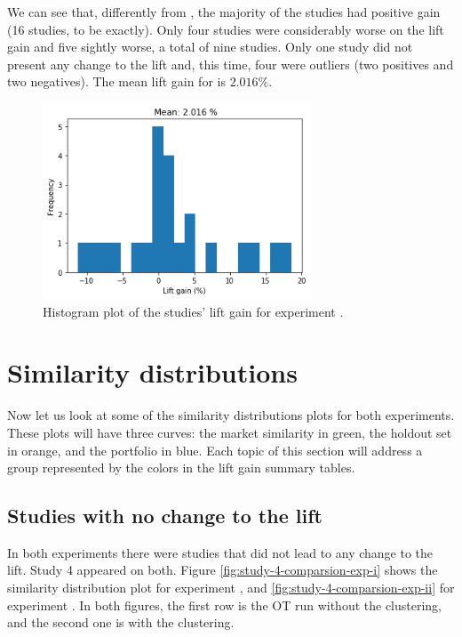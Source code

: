 We can see that, differently from \nameExperimentI{}, the majority of the studies had positive gain (16 studies, to be exactly). Only four studies were considerably worse on the lift gain and five sightly worse, a total of nine studies. Only one study did not present any change to the lift and, this time, four were outliers (two positives and two negatives). The mean lift gain for \nameExperimentII{} is $2.016 \%$.

\begin{figure}[!ht]
   \centering
   \includegraphics[width=8cm]{fig/ch4-lift-hist-plot-exp-ii.png}
   \caption{Histogram plot of the studies' lift gain for experiment \nameExperimentII{}.}
   \label{fig:lift-hist-plot-exp-ii}
\end{figure}

\section{Similarity distributions}
\label{ch:simi-distis}

Now let us look at some of the similarity distributions plots for both experiments. These plots will have three curves: the market similarity in green, the holdout set in orange, and the portfolio in blue. Each topic of this section will address a group represented by the colors in the lift gain summary tables. 

\subsection{Studies with no change to the lift}

In both experiments there were studies that did not lead to any change to the lift. Study 4 appeared on both. Figure \ref{fig:study-4-comparsion-exp-i} shows the similarity distribution plot for experiment \nameExperimentI{}, and \ref{fig:study-4-comparsion-exp-ii} for experiment \nameExperimentII{}. In both figures, the first row is the OT run without the clustering, and the second one is with the clustering.

